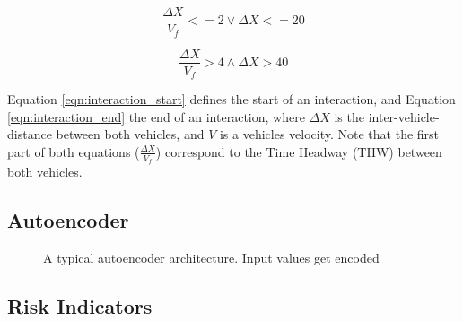 \begin{equation}
\label{eqn:interaction_start}
\frac{\Delta X}{V_f} <= 2 \lor \Delta X <= 20
\end{equation}

\begin{equation}
\label{eqn:interaction_end}
\frac{\Delta X}{V_f} > 4 \land \Delta X > 40
\end{equation}

Equation \ref{eqn:interaction_start} defines the start of an interaction, and Equation \ref{eqn:interaction_end} the end of an interaction, where $\Delta X$ is the inter-vehicle-distance between both vehicles, and $V$ is a vehicles velocity.
Note that the first part of both equations ($\frac{\Delta X}{V_f}$) correspond to the Time Headway (THW) between both vehicles.

\subsection{Autoencoder}
\label{sec:experimental_setup_autoencoder}

\begin{figure}

\caption{A typical autoencoder architecture. Input values get encoded }
\label{fig:autoencoder}
\end{figure}

\subsection{Risk Indicators}
\label{sec:experimental_setup_risk_indicators}
